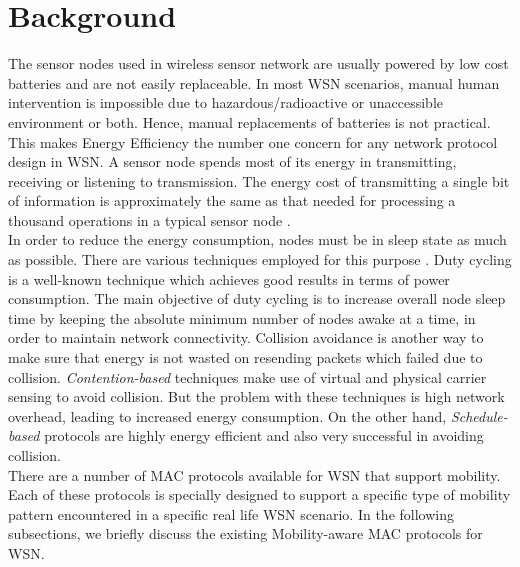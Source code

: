\documentclass[a4paper, conference, 10pt]{IEEEtran}
\begin{document}
\section{Background}
\label{bg}
The sensor nodes used in wireless sensor network are usually powered by low cost batteries and are not easily replaceable. In most WSN scenarios, manual human intervention is impossible due to hazardous/radioactive or unaccessible environment or both. Hence, manual replacements of batteries is not practical. This makes Energy Efficiency the number one concern for any network protocol design in WSN. A sensor node spends most of its energy in transmitting, receiving or listening to transmission. The energy cost of transmitting a single bit of information is approximately the same as that needed for processing a thousand operations in a typical sensor node \cite{eeff_q}. \\

In order to reduce the energy consumption, nodes must be in sleep state as much as possible. There are various techniques employed for this purpose \cite{eeff_tech}. Duty cycling is a well-known technique which achieves good results in terms of power consumption. The main objective of duty cycling is to increase overall node sleep time by keeping the absolute minimum number of nodes awake at a time, in order to maintain network connectivity. Collision avoidance is another way to make sure that energy is not wasted on resending packets which failed due to collision. \emph{Contention-based} techniques make use of virtual and physical carrier sensing to avoid collision. But the problem with these techniques is high network overhead, leading to increased energy consumption. On the other hand, \emph{Schedule-based} protocols are highly energy efficient and also very successful in avoiding collision. \\

There are a number of MAC protocols available for WSN that support mobility. Each of these protocols is specially designed to support a specific type of mobility pattern encountered in a specific real life WSN scenario. In the following subsections, we briefly discuss the existing Mobility-aware MAC protocols for WSN.\\
\end{document}
